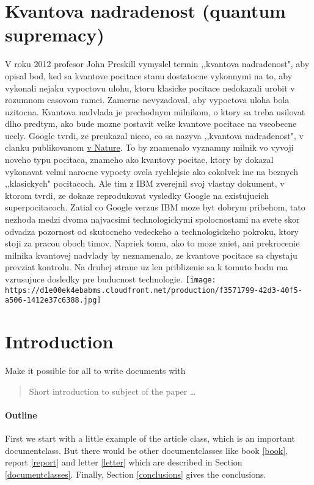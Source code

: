 \documentclass{article}
\begin{document}
\section{Kvantova nadradenost (quantum supremacy)}
V roku 2012 profesor John Preskill vymyslel termin ,,kvantova nadradenost", aby opisal bod, ked sa kvantove pocitace stanu dostatocne vykonnymi na to, aby vykonali nejaku vypoctovu ulohu, ktoru klasicke pocitace nedokazali urobit v rozumnom casovom ramci. Zamerne nevyzadoval, aby vypoctova uloha bola uzitocna. Kvantova nadvlada je prechodnym milnikom, o ktory sa treba usilovat dlho predtym, ako bude mozne postavit velke kvantove pocitace na vseobecne ucely.
\bigbreak
Google tvrdi, ze preukazal nieco, co sa nazyva ,,kvantova nadradenost", v clanku publikovanom \href{https://www.nature.com/articles/s41586-019-1666-5}{v Nature}. To by znamenalo vyznamny milnik vo vyvoji noveho typu pocitaca, znameho ako kvantovy pocitac, ktory by dokazal vykonavat velmi narocne vypocty ovela rychlejsie ako cokolvek ine na beznych ,,klasickych" pocitacoch. Ale tim z IBM zverejnil svoj vlastny dokument, v ktorom tvrdi, ze dokaze reprodukovat vysledky Google na existujucich superpocitacoch.
\bigbreak
Zatial co Google verzus IBM moze byt dobrym pribehom, tato nezhoda medzi dvoma najvacsimi technologickymi spolocnostami na svete skor odvadza pozornost od skutocneho vedeckeho a technologickeho pokroku, ktory stoji za pracou oboch timov. Napriek tomu, ako to moze zniet, ani prekrocenie milnika kvantovej nadvlady by neznamenalo, ze kvantove pocitace sa chystaju prevziat kontrolu. Na druhej strane uz len priblizenie sa k tomuto bodu ma vzrusujuce dosledky pre buducnost technologie.
\bigbreak
\bigbreak
\texttt{[image: https://d1e00ek4ebabms.cloudfront.net/production/f3571799-42d3-40f5-a506-1412e37c6388.jpg]}
\bigbreak

\section{Introduction}
Make it possible for all to write documents with

\begin{abstract}
Short introduction to subject of the paper \ldots
\end{abstract}

\paragraph{Outline}
First we start with a little example of the article class, which is an
important documentclass. But there would be other documentclasses like
book \ref{book}, report \ref{report} and letter \ref{letter} which are
described in Section \ref{documentclasses}. Finally, Section
\ref{conclusions} gives the conclusions.
\end{document}

